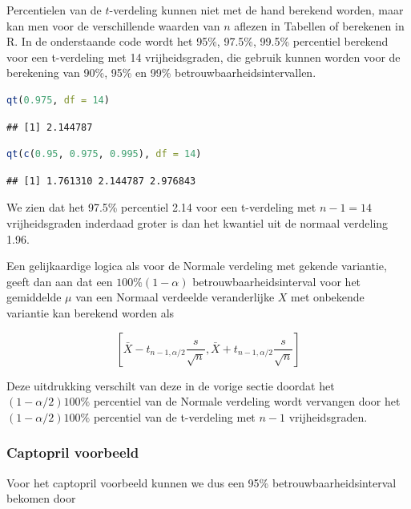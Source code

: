 \documentclass[
  12pt,dutch,coursenotes]{book}
\theoremstyle{definition}
\theoremstyle{definition}
\theoremstyle{definition}
\theoremstyle{definition}
\theoremstyle{remark}
\begin{document}
Percentielen van de \(t\)-verdeling kunnen niet met de hand berekend worden,
maar kan men voor de verschillende waarden van \(n\) aflezen in Tabellen of berekenen in R.
In de onderstaande code wordt het 95\%, 97.5\%, 99.5\% percentiel berekend voor een t-verdeling met 14 vrijheidsgraden, die gebruik kunnen worden voor de berekening van 90\%, 95\% en 99\% betrouwbaarheidsintervallen.

\begin{lstlisting}[language=R]
qt(0.975, df = 14)
\end{lstlisting}

\begin{lstlisting}
## [1] 2.144787
\end{lstlisting}

\begin{lstlisting}[language=R]
qt(c(0.95, 0.975, 0.995), df = 14)
\end{lstlisting}

\begin{lstlisting}
## [1] 1.761310 2.144787 2.976843
\end{lstlisting}

We zien dat het 97.5\% percentiel 2.14 voor een t-verdeling met \(n-1=14\) vrijheidsgraden inderdaad groter is dan het kwantiel uit de normaal verdeling 1.96.

Een gelijkaardige logica als voor de Normale verdeling met gekende variantie, geeft dan aan dat een \(100\% (1-\alpha)\) betrouwbaarheidsinterval voor het gemiddelde \(\mu\) van een
Normaal verdeelde veranderlijke \(X\) met onbekende variantie kan berekend
worden als

\begin{equation*}
\left[\bar{X} - t_{n-1, \alpha/2} \frac{s}{\sqrt{n}} , \bar{X} + t_{n-1,
\alpha/2} \frac{s}{\sqrt{n}}\right]
\end{equation*}

Deze uitdrukking verschilt van deze in de vorige sectie doordat het \((1-\alpha/2)100\%\) percentiel van de Normale verdeling wordt vervangen door
het \((1-\alpha/2)100\%\) percentiel van de t-verdeling met \(n-1\)
vrijheidsgraden.

\hypertarget{captopril-voorbeeld-1}{%
\subsubsection{Captopril voorbeeld}\label{captopril-voorbeeld-1}}

Voor het captopril voorbeeld kunnen we dus een 95\% betrouwbaarheidsinterval bekomen door
\end{document}
